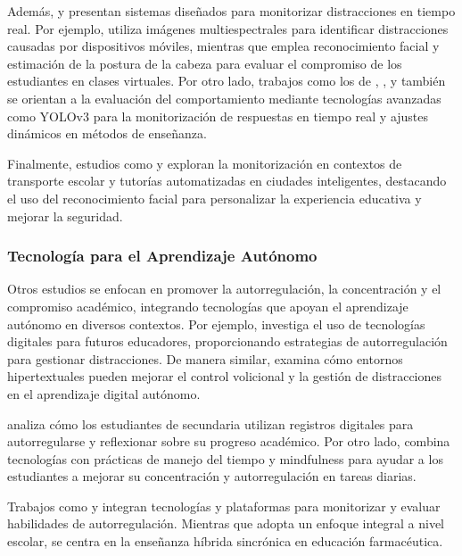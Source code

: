 \documentclass[a4paper,fleqn]{cas-sc}
\begin{document}
				Además, \cite{Campbell2015Using} y \cite{Ucar2022Recognizing} presentan sistemas diseñados para monitorizar distracciones en tiempo real. Por ejemplo, \cite{Campbell2015Using} utiliza imágenes multiespectrales para identificar distracciones causadas por dispositivos móviles, mientras que \cite{Ucar2022Recognizing} emplea reconocimiento facial y estimación de la postura de la cabeza para evaluar el compromiso de los estudiantes en clases virtuales. Por otro lado, trabajos como los de \cite{Argel2023Intellitell}, \cite{Erazo2016Easing}, y \cite{Nguyen2019} también se orientan a la evaluación del comportamiento mediante tecnologías avanzadas como YOLOv3 para la monitorización de respuestas en tiempo real y ajustes dinámicos en métodos de enseñanza.
				
				Finalmente, estudios como \cite{Boumiza2017} y \cite{DaCosta2023} exploran la monitorización en contextos de transporte escolar y tutorías automatizadas en ciudades inteligentes, destacando el uso del reconocimiento facial para personalizar la experiencia educativa y mejorar la seguridad.
				
			\subsubsection{Tecnología para el Aprendizaje Autónomo}
				Otros estudios se enfocan en promover la autorregulación, la concentración y el compromiso académico, integrando tecnologías que apoyan el aprendizaje autónomo en diversos contextos. Por ejemplo, \cite{Bembich2016Future} investiga el uso de tecnologías digitales para futuros educadores, proporcionando estrategias de autorregulación para gestionar distracciones. De manera similar, \cite{Peters2003Self} examina cómo entornos hipertextuales pueden mejorar el control volicional y la gestión de distracciones en el aprendizaje digital autónomo.
				
				\cite{Roberts2020Task} analiza cómo los estudiantes de secundaria utilizan registros digitales para autorregularse y reflexionar sobre su progreso académico. Por otro lado, \cite{Adcroft2018Developing} combina tecnologías con prácticas de manejo del tiempo y mindfulness para ayudar a los estudiantes a mejorar su concentración y autorregulación en tareas diarias.
				
				Trabajos como \cite{Salter2014Exploring} y \cite{Palmer2022impact} integran tecnologías y plataformas para monitorizar y evaluar habilidades de autorregulación. Mientras que \cite{Salter2014Exploring} adopta un enfoque integral a nivel escolar, \cite{Palmer2022impact} se centra en la enseñanza híbrida sincrónica en educación farmacéutica.
				
\end{document}
